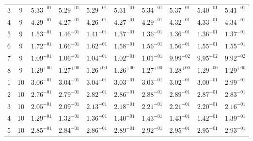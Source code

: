 \begin{table}
\begin{tabular}{c c c c c c c c c c}
   3 &    9 & $ 5.33^{-01}$ & $ 5.29^{-01}$ & $ 5.29^{-01}$ & $ 5.31^{-01}$ & $ 5.34^{-01}$ & $ 5.37^{-01}$ & $ 5.40^{-01}$ & $ 5.41^{-01}$ \\%
   4 &    9 & $ 4.29^{-01}$ & $ 4.27^{-01}$ & $ 4.26^{-01}$ & $ 4.27^{-01}$ & $ 4.29^{-01}$ & $ 4.32^{-01}$ & $ 4.33^{-01}$ & $ 4.34^{-01}$ \\%
   5 &    9 & $ 1.53^{-01}$ & $ 1.46^{-01}$ & $ 1.41^{-01}$ & $ 1.37^{-01}$ & $ 1.36^{-01}$ & $ 1.36^{-01}$ & $ 1.36^{-01}$ & $ 1.37^{-01}$ \\%
   6 &    9 & $ 1.72^{-01}$ & $ 1.66^{-01}$ & $ 1.62^{-01}$ & $ 1.58^{-01}$ & $ 1.56^{-01}$ & $ 1.56^{-01}$ & $ 1.55^{-01}$ & $ 1.55^{-01}$ \\%
   7 &    9 & $ 1.09^{-01}$ & $ 1.06^{-01}$ & $ 1.04^{-01}$ & $ 1.02^{-01}$ & $ 1.01^{-01}$ & $ 9.99^{-02}$ & $ 9.95^{-02}$ & $ 9.92^{-02}$ \\%
      8 &    9 & $ 1.29^{+00}$ & $ 1.27^{+00}$ & $ 1.26^{+00}$ & $ 1.26^{+00}$ & $ 1.27^{+00}$ & $ 1.28^{+00}$ & $ 1.29^{+00}$ & $ 1.29^{+00}$ \\%
  1 &  10 & $ 3.06^{-01}$ & $ 3.04^{-01}$ & $ 3.04^{-01}$ & $ 3.03^{-01}$ & $ 3.03^{-01}$ & $ 3.02^{-01}$ & $ 3.00^{-01}$ & $ 2.99^{-01}$ \\%
   2 &   10 & $ 2.76^{-01}$ & $ 2.79^{-01}$ & $ 2.82^{-01}$ & $ 2.86^{-01}$ & $ 2.88^{-01}$ & $ 2.89^{-01}$ & $ 2.87^{-01}$ & $ 2.83^{-01}$ \\%
   3 &   10 & $ 2.05^{-01}$ & $ 2.09^{-01}$ & $ 2.13^{-01}$ & $ 2.18^{-01}$ & $ 2.21^{-01}$ & $ 2.21^{-01}$ & $ 2.20^{-01}$ & $ 2.16^{-01}$ \\%
   4 &   10 & $ 1.29^{-01}$ & $ 1.32^{-01}$ & $ 1.36^{-01}$ & $ 1.40^{-01}$ & $ 1.43^{-01}$ & $ 1.43^{-01}$ & $ 1.42^{-01}$ & $ 1.39^{-01}$ \\%
   5 &   10 & $ 2.85^{-01}$ & $ 2.84^{-01}$ & $ 2.86^{-01}$ & $ 2.89^{-01}$ & $ 2.92^{-01}$ & $ 2.95^{-01}$ & $ 2.95^{-01}$ & $ 2.93^{-01}$ \\%

\end{tabular}
\end{table}
